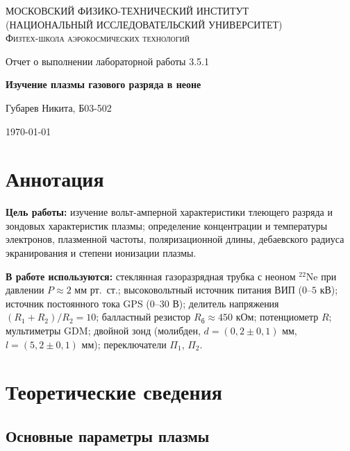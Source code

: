 \documentclass[a4paper]{article}
\begin{document}
	
	\begin{titlepage}
		\centering
		{\scshape\Large МОСКОВСКИЙ ФИЗИКО-ТЕХНИЧЕСКИЙ ИНСТИТУТ \\
			(НАЦИОНАЛЬНЫЙ ИССЛЕДОВАТЕЛЬСКИЙ УНИВЕРСИТЕТ)\\
			Физтех-школа аэрокосмических технологий}
		
		\vspace{4cm}
		{\LARGE Отчет о выполнении лабораторной работы 3.5.1}
		\vspace{1cm}
		
		{\huge\bf Изучение плазмы газового разряда в неоне}
		
		\vspace{1cm}
		\vfill
		
		\begin{flushright}
			{\LARGE Губарев Никита, Б03-502}
		\end{flushright}
		\vfill 
		\today
	\end{titlepage}
	
	\tableofcontents
	
	\section{Аннотация}
	
	\textbf{Цель работы:} изучение вольт-амперной характеристики тлеющего разряда и зондовых характеристик плазмы; определение концентрации и температуры электронов, плазменной частоты, поляризационной длины, дебаевского радиуса экранирования и степени ионизации плазмы.
	
	\textbf{В работе используются:} стеклянная газоразрядная трубка с неоном $^{22}$Ne при давлении $P \approx 2$ мм рт.~ст.; высоковольтный источник питания ВИП ($0$--$5$ кВ); источник постоянного тока GPS ($0$--$30$ В); делитель напряжения $(R_1+R_2)/R_2 = 10$; балластный резистор $R_б \approx 450$ кОм; потенциометр $R$; мультиметры GDM; двойной зонд (молибден, $d = (0{,}2 \pm 0{,}1)$ мм, $l = (5{,}2 \pm 0{,}1)$ мм); переключатели $\Pi_1$, $\Pi_2$.
	
	\section{Теоретические сведения}
	
	\subsection{Основные параметры плазмы}
	
\end{document}
